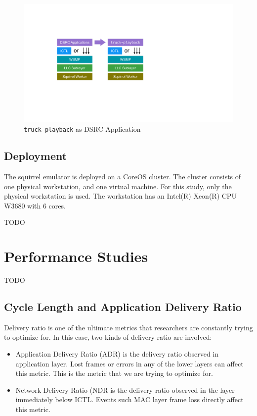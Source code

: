 \documentclass[12pt]{report}
\begin{document}
\begin{figure}[h]
  \begin{center}
    \includegraphics[width=.6\textwidth]{figures/playback_arch.pdf}
    \caption{\label{playback_arch}\texttt{truck-playback} as DSRC Application}
  \end{center}
\end{figure}

\subsection{Deployment}

The squirrel emulator is deployed on a CoreOS \cite{coreos} cluster. The cluster consists of one physical workstation, and one virtual machine. For this study, only the physical workstation is used. The workstation has an Intel(R) Xeon(R) CPU W3680 with 6 cores.

TODO

\section{Performance Studies}

TODO

\subsection{Cycle Length and Application Delivery Ratio}
\label{sec:cl_adr}

Delivery ratio is one of the ultimate metrics that researchers are constantly trying to optimize for. In this case, two kinds of delivery ratio are involved:

\begin{itemize}
  \item Application Delivery Ratio (ADR) is the delivery ratio observed in application layer. Lost frames or errors in any of the lower layers can affect this metric. This is the metric that we are trying to optimize for.
  \item Network Delivery Ratio (NDR is the delivery ratio observed in the layer immediately below ICTL. Events such MAC layer frame loss directly affect this metric.
\end{itemize}
\end{document}
